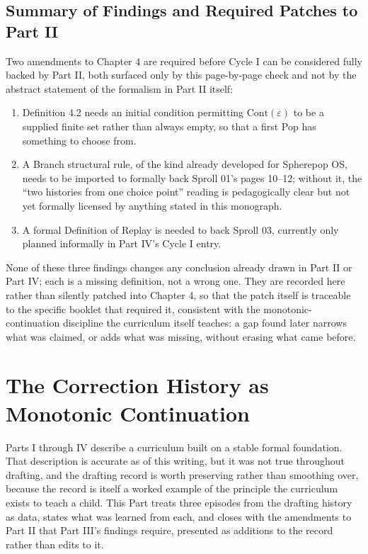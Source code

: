 \documentclass[11pt,twoside]{book}
\begin{document}
\chapter{Summary of Findings and Required Patches to Part II}

Two amendments to Chapter 4 are required before Cycle I can be considered fully backed by Part II, both surfaced only by this page-by-page check and not by the abstract statement of the formalism in Part II itself:

\begin{enumerate}
\item Definition 4.2 needs an initial condition permitting $\mathrm{Cont}(\varepsilon)$ to be a supplied finite set rather than always empty, so that a first Pop has something to choose from.
\item A Branch structural rule, of the kind already developed for Spherepop OS, needs to be imported to formally back Sproll 01's pages 10--12; without it, the ``two histories from one choice point'' reading is pedagogically clear but not yet formally licensed by anything stated in this monograph.
\item A formal Definition of Replay is needed to back Sproll 03, currently only planned informally in Part IV's Cycle I entry.
\end{enumerate}

None of these three findings changes any conclusion already drawn in Part II or Part IV; each is a missing definition, not a wrong one. They are recorded here rather than silently patched into Chapter 4, so that the patch itself is traceable to the specific booklet that required it, consistent with the monotonic-continuation discipline the curriculum itself teaches: a gap found later narrows what was claimed, or adds what was missing, without erasing what came before.

\part{The Correction History as Monotonic Continuation}

Parts I through IV describe a curriculum built on a stable formal foundation. That description is accurate as of this writing, but it was not true throughout drafting, and the drafting record is worth preserving rather than smoothing over, because the record is itself a worked example of the principle the curriculum exists to teach a child. This Part treats three episodes from the drafting history as data, states what was learned from each, and closes with the amendments to Part II that Part III's findings require, presented as additions to the record rather than edits to it.
\end{document}
